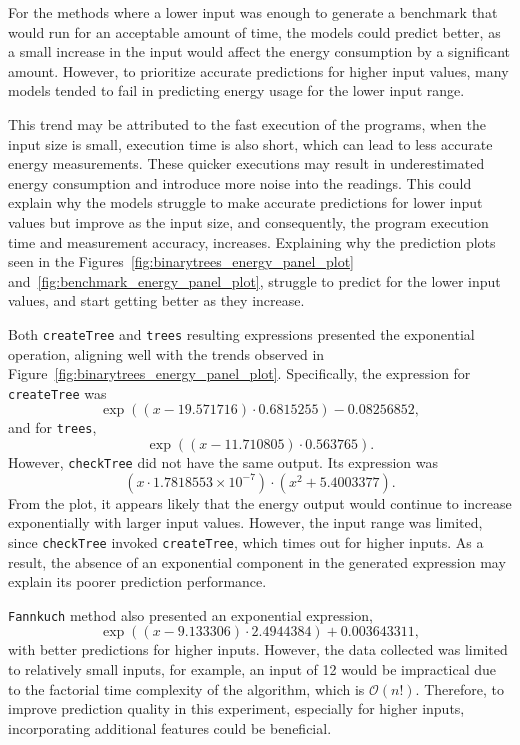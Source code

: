 For the methods where a lower input was enough to generate a benchmark that would run for an acceptable amount of time, the models could predict better, as a small increase in the input would affect the energy consumption by a significant amount. However, to prioritize accurate predictions for higher input values, many models tended to fail in predicting energy usage for the lower input range. 

This trend may be attributed to the fast execution of the programs, when the input size is small, execution time is also short, which can lead to less accurate energy measurements. These quicker executions may result in underestimated energy consumption and introduce more noise into the readings. This could explain why the models struggle to make accurate predictions for lower input values but improve as the input size, and consequently, the program execution time and measurement accuracy, increases. Explaining why the prediction plots seen in the Figures~\ref{fig:binarytrees_energy_panel_plot} and~\ref{fig:benchmark_energy_panel_plot}, struggle to predict for the lower input values, and start getting better as they increase.

Both \texttt{createTree} and \texttt{trees} resulting expressions presented the exponential operation, aligning well with the trends observed in Figure~\ref{fig:binarytrees_energy_panel_plot}. Specifically, the expression for \texttt{createTree} was  
\[
\exp\left((x - 19.571716) \cdot 0.6815255\right) - 0.08256852,
\]  
and for \texttt{trees},  
\[
\exp\left((x - 11.710805) \cdot 0.563765\right).
\]  
However, \texttt{checkTree} did not have the same output. Its expression was  
\[
(x \cdot 1.7818553 \times 10^{-7}) \cdot \left(x^2 + 5.4003377\right).
\]  
From the plot, it appears likely that the energy output would continue to increase exponentially with larger input values. However, the input range was limited, since \texttt{checkTree} invoked \texttt{createTree}, which times out for higher inputs. As a result, the absence of an exponential component in the generated expression may explain its poorer prediction performance.

\texttt{Fannkuch} method also presented an exponential expression,  
\[
\exp\left((x - 9.133306) \cdot 2.4944384\right) + 0.003643311,
\]  
with better predictions for higher inputs. However, the data collected was limited to relatively small inputs, for example, an input of 12 would be impractical due to the factorial time complexity of the algorithm, which is \(\mathcal{O}(n!)\). Therefore, to improve prediction quality in this experiment, especially for higher inputs, incorporating additional features could be beneficial.

